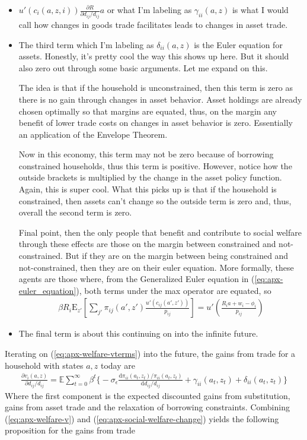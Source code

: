 \documentclass[12pt,pdftex]{article}
\begin{document}
\begin{onehalfspacing}
\begin{itemize}
\item $u'(c_{i}(a,z,i))\frac{\partial R}{\partial d_{ij} / d_{ij}}a$ or what I'm labeling as $\gamma_{ii}(a,z)$ is what I would call how changes in goods trade facilitates leads to changes in asset trade.

\item The third term which I'm labeling as $\delta_{ii}(a,z)$  is the Euler equation for assets. Honestly, it's pretty cool the way this shows up here. But it should also zero out through some basic arguments. Let me expand on this.

    The idea is that if the household is unconstrained, then this term is zero as there is no gain through changes in asset behavior. Asset holdings are already chosen optimally so that margins are equated, thus, on the margin any benefit of lower trade costs on changes in asset behavior is zero. Essentially an application of the Envelope Theorem.

    Now in this economy, this term may not be zero because of borrowing constrained households, thus this term is positive. However, notice how the outside brackets is multiplied by the change in the asset policy function. Again, this is super cool. What this picks up is that if the household is constrained, then assets can't change so the outside term is zero and, thus, overall the second term is zero.

    Final point, then the only people that benefit and contribute to social welfare through these effects are those on the margin between constrained and not-constrained. But if they are on the margin between being constrained and not-constrained, then they are on their euler equation. More formally, these agents are those where, from the Generalized Euler equation in (\ref{eq:apx-euler_equation}), both terms under the max operator are equated, so
    \begin{align}
    \beta R_{i} \mathrm{E}_{z'} \left[ \sum_{j'} \pi_{ij}(a', z') \frac{u'(c_{ij}(a', z'))}{p_{ij}} \right]  = u' \left( \frac{R_i a + w_i - \phi_{i}}{p_{ij}} \right)
    \end{align}

\item The final term is about this continuing on into the infinite future.
\end{itemize}
Iterating on (\ref{eq:apx-welfare-vterms}) into the future, the gains from trade for a household with states $a,z$ today are
\begin{align}
\frac{\partial v_i(a, z)}{\partial d_{ij} / d_{ij}} = \mathbb{E} \sum_{t = 0}^{\infty} \beta^{t} \bigg \{ -\sigma_{\epsilon} \frac{\mathrm{d} \pi_{ii}(a_{t},z_{t}) / \pi_{ii}(a_{t},z_{t})}{\mathrm{d}d_{ij} / d_{ij}} + \gamma_{ii}(a_{t},z_{t}) + \delta_{ii}(a_{t},z_{t}) \bigg \}
\label{eq:apx-welfare-v}
\end{align}
Where the first component is the expected discounted gains from substitution, gains from asset trade and the relaxation of borrowing constraints. Combining (\ref{eq:apx-welfare-v}) and (\ref{eq:apx-social-welfare-change}) yields the following proposition for the gains from trade


\end{onehalfspacing}
\end{document}
